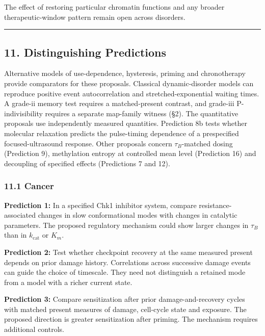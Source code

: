 \documentclass[
]{article}
\begin{document}
The effect of restoring particular chromatin functions and any broader
therapeutic-window pattern remain open across disorders.

\begin{center}\rule{0.5\linewidth}{0.5pt}\end{center}

\hypertarget{distinguishing-predictions}{%
\subsection{11. Distinguishing
Predictions}\label{distinguishing-predictions}}

Alternative models of use-dependence, hysteresis, priming and
chronotherapy provide comparators for these proposals. Classical
dynamic-disorder models can reproduce positive event autocorrelation and
stretched-exponential waiting times. A grade-ii memory test requires a
matched-present contrast, and grade-iii P-indivisibility requires a
separate map-family witness (§2). The quantitative proposals use
independently measured quantities. Prediction 8b tests whether molecular
relaxation predicts the pulse-timing dependence of a prespecified
focused-ultrasound response. Other proposals concern \(\tau_B\)-matched
dosing (Prediction 9), methylation entropy at controlled mean level
(Prediction 16) and decoupling of specified effects (Predictions 7 and
12).

\hypertarget{cancer}{%
\subsubsection{11.1 Cancer}\label{cancer}}

\textbf{Prediction 1:} In a specified Chk1 inhibitor system, compare
resistance-associated changes in slow conformational modes with changes
in catalytic parameters. The proposed regulatory mechanism could show
larger changes in \(\tau_B\) than in \(k_{\text{cat}}\) or \(K_m\).

\textbf{Prediction 2:} Test whether checkpoint recovery at the same
measured present depends on prior damage history. Correlations across
successive damage events can guide the choice of timescale. They need
not distinguish a retained mode from a model with a richer current
state.

\textbf{Prediction 3:} Compare sensitization after prior
damage-and-recovery cycles with matched present measures of damage,
cell-cycle state and exposure. The proposed direction is greater
sensitization after priming. The mechanism requires additional controls.
\end{document}
